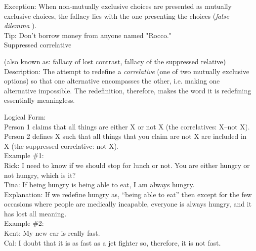 \documentclass[a4paper,12pt,single,pdftex]{scrartcl}
\begin{document}
    
      Exception: When non-mutually exclusive choices are presented as mutually exclusive choices, the fallacy lies with the one presenting the choices ({\it false dilemma} ).
    \\

    
      Tip: Don’t borrow money from anyone named "Rocco."
    \\

  

Suppressed correlative
    
      (also known as: fallacy of lost contrast, fallacy of the suppressed relative)
    \\

  
    Description: The attempt to redefine a {\it correlative} (one of two mutually exclusive options) so that one alternative encompasses the other, i.e. making one alternative impossible. The redefinition, therefore, makes the word it is redefining essentially meaningless.

    
      Logical Form:
    \\

    
      Person 1 claims that all things are either X or not X (the correlatives: X–not X).
    \\

    
      Person 2 defines X such that all things that you claim are not X are included in X (the suppressed correlative: not X).
    \\

    
      Example \#1:
    \\

    
      Rick: I need to know if we should stop for lunch or not.  You are either hungry or not hungry, which is it?
    \\

    
      Tina: If being hungry is being able to eat, I am always hungry.
    \\

    
      Explanation: If we redefine hungry as, “being able to eat” then except for the few occasions where people are medically incapable, everyone is always hungry, and it has lost all meaning.
    \\

    
      Example \#2:
    \\

    
      Kent: My new car is really fast.
    \\

    
      Cal: I doubt that it is as fast as a jet fighter so, therefore, it is not fast.
    \\
\end{document}
